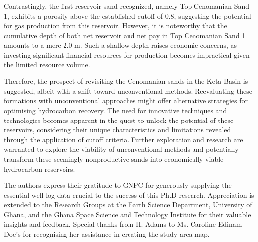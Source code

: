 \documentclass{gji}
\begin{document}
Contrastingly, the first reservoir sand recognized, namely Top Cenomanian Sand 1, exhibits a porosity above the established cutoff of $0.8$, suggesting the potential for gas production from this reservoir. 
However, it is noteworthy that the cumulative depth of both net reservoir and net pay in Top Cenomanian Sand 1 amounts to a mere $2.0$ m.
Such a shallow depth raises economic concerns, as investing significant financial resources for production becomes impractical given the limited resource volume.

Therefore, the prospect of revisiting the Cenomanian sands in the Keta Basin is suggested, albeit with a shift toward unconventional methods. Reevaluating these formations with unconventional approaches might offer alternative strategies for optimising hydrocarbon recovery.
The need for innovative techniques and technologies becomes apparent in the quest to unlock the potential of these reservoirs, considering their unique characteristics and limitations revealed through the application of cutoff criteria.
Further exploration and research are warranted to explore the viability of unconventional methods and potentially transform these seemingly nonproductive sands into economically viable hydrocarbon reservoirs.


\begin{acknowledgments}
The authors express their gratitude to GNPC for generously supplying the essential well-log data crucial to the success of this Ph.D research. 
Appreciation is extended to the Research Groups at the Earth Science Department, University of Ghana, and the Ghana Space Science and Technology Institute for their valuable insights and feedback. 
Special thanks from H. Adams to Ms. Caroline Edinam Doe's for recognising her assistance in creating the study area map.
\end{acknowledgments}


\end{document}
